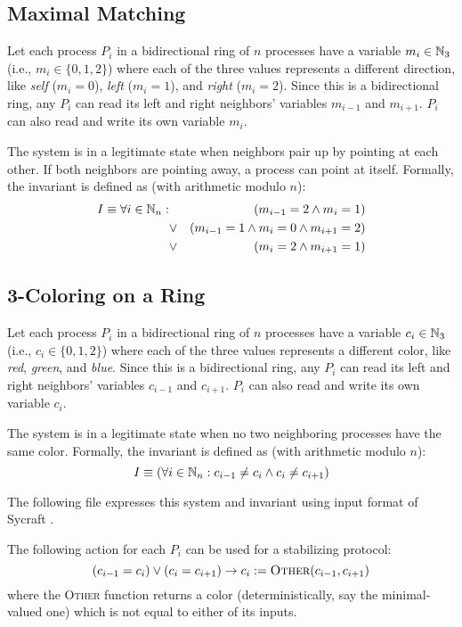 \subsection{Maximal Matching}

Let each process $P_i$ in a bidirectional ring of $n$ processes have a variable $m_i\in \mathbb{N}_3$ (i.e., $m_i\in \{0,1,2\}$) where each of the three values represents a different direction, like {\it self} ($m_i=0$), {\it left} ($m_i=1$), and {\it right} ($m_i=2$).
Since this is a bidirectional ring, any $P_i$ can read its left and right neighbors' variables $m_{i-1}$ and $m_{i+1}$.
$P_i$ can also read and write its own variable $m_i$.

The system is in a legitimate state when neighbors pair up by pointing at each other.
If both neighbors are pointing away, a process can point at itself.
Formally, the invariant is defined as (with arithmetic modulo $n$):
\begin{eqnarray*}
 I \equiv \forall i\in\mathbb{N}_n: & & (m_{i-1} = 2 \wedge m_i = 1)
                    \\ & \vee  & (m_{i-1} = 1 \wedge m_i = 0 \wedge m_{i+1} = 2)
                    \\ & \vee  & (m_i = 2 \wedge m_{i+1} = 1)
\end{eqnarray*}

\subsection{3-Coloring on a Ring}

Let each process $P_i$ in a bidirectional ring of $n$ processes have a variable $c_i\in \mathbb{N}_3$ (i.e., $c_i\in \{0,1,2\}$) where each of the three values represents a different color, like {\it red}, {\it green}, and {\it blue}.
Since this is a bidirectional ring, any $P_i$ can read its left and right neighbors' variables $c_{i-1}$ and $c_{i+1}$.
$P_i$ can also read and write its own variable $c_i$.

The system is in a legitimate state when no two neighboring processes have the same color.
Formally, the invariant is defined as (with arithmetic modulo $n$):
\[ I \equiv (\forall i\in\mathbb{N}_n: c_{i-1}\ne c_i \wedge c_i \ne c_{i+1}) \]

The following file expresses this system and invariant using input format of Sycraft \cite{sycraft2008}.

\fbox{
 
}

The following action for each $P_i$ can be used for a stabilizing protocol:
\[
 (c_{i-1} = c_i) \vee (c_i = c_{i+1}) \to c_i := \textsc{Other}(c_{i-1}, c_{i+1})
\]
where the \textsc{Other} function returns a color (deterministically, say the minimal-valued one) which is not equal to either of its inputs.

